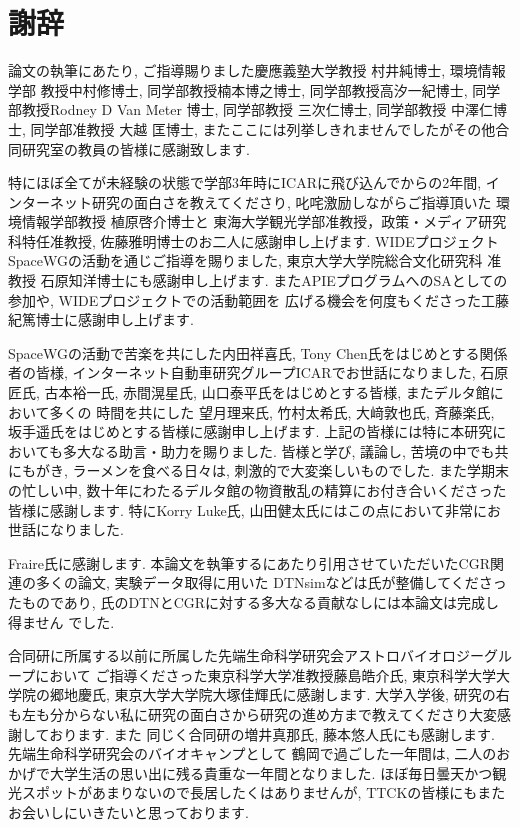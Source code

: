 \chapter*{謝辞}
論文の執筆にあたり, ご指導賜りました慶應義塾大学教授 村井純博士, 環境情報学部
教授中村修博士, 同学部教授楠本博之博士, 同学部教授高汐一紀博士, 同学部教授Rodney
D Van Meter 博士, 同学部教授 三次仁博士, 同学部教授 中澤仁博士, 同学部准教授 大越
匡博士, またここには列挙しきれませんでしたがその他合同研究室の教員の皆様に感謝致します. 

特にほぼ全てが未経験の状態で学部3年時にICARに飛び込んでからの2年間, 
インターネット研究の面白さを教えてくださり, 叱咤激励しながらご指導頂いた
環境情報学部教授 植原啓介博士と
東海大学観光学部准教授，政策・メディア研究科特任准教授, 佐藤雅明博士のお二人に感謝申し上げます. 
WIDEプロジェクトSpaceWGの活動を通じご指導を賜りました, 
東京大学大学院総合文化研究科 准教授 石原知洋博士にも感謝申し上げます. 
またAPIEプログラムへのSAとしての参加や, WIDEプロジェクトでの活動範囲を
広げる機会を何度もくださった工藤紀篤博士に感謝申し上げます. 

SpaceWGの活動で苦楽を共にした内田祥喜氏, Tony Chen氏をはじめとする関係者の皆様, 
インターネット自動車研究グループICARでお世話になりました, 
石原匠氏, 古本裕一氏, 赤間滉星氏, 山口泰平氏をはじめとする皆様, 
またデルタ館において多くの 時間を共にした
望月理来氏, 竹村太希氏, 大﨑敦也氏, 斉藤楽氏, 坂手遥氏をはじめとする皆様に感謝申し上げます. 
上記の皆様には特に本研究においても多大なる助言・助力を賜りました. 
皆様と学び, 議論し, 苦境の中でも共にもがき, ラーメンを食べる日々は, 刺激的で大変楽しいものでした. 
また学期末の忙しい中, 数十年にわたるデルタ館の物資散乱の精算にお付き合いくださった皆様に感謝します. 
特にKorry Luke氏, 山田健太氏にはこの点において非常にお世話になりました. 

Fraire氏に感謝します. 本論文を執筆するにあたり引用させていただいたCGR関連の多くの論文, 実験データ取得に用いた
DTNsimなどは氏が整備してくださったものであり, 氏のDTNとCGRに対する多大なる貢献なしには本論文は完成し得ません
でした. 

合同研に所属する以前に所属した先端生命科学研究会アストロバイオロジーグループにおいて
ご指導くださった東京科学大学准教授藤島皓介氏, 東京科学大学大学院の郷地慶氏, 東京大学大学院大塚佳輝氏に感謝します. 
大学入学後, 研究の右も左も分からない私に研究の面白さから研究の進め方まで教えてくださり大変感謝しております. また
同じく合同研の増井真那氏, 藤本悠人氏にも感謝します. 先端生命科学研究会のバイオキャンプとして
鶴岡で過ごした一年間は, 二人のおかげで大学生活の思い出に残る貴重な一年間となりました. 
ほぼ毎日曇天かつ観光スポットがあまりないので長居したくはありませんが, TTCKの皆様にもまたお会いしにいきたいと思っております. 


